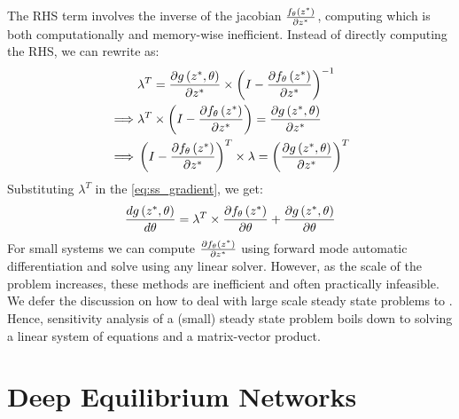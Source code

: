 %
The RHS term involves the inverse of the jacobian $\frac{f_\theta\left(z^*\right)}{\partial z^*}$, computing which is both computationally and memory-wise inefficient. Instead of directly computing the RHS, we can rewrite  as:
%
\begin{align}
           & \lambda^T = \frac{\partial g\left(z^*, \theta\right)}{\partial z^*} \times \left( I - \frac{\partial f_\theta\left(z^*\right)}{\partial z^*} \right)^{-1}                                       \\
  \implies & \lambda^T \times \left( I - \frac{\partial f_\theta\left(z^*\right)}{\partial z^*} \right) = \frac{\partial g\left(z^*, \theta\right)}{\partial z^*}                                            \\
  \implies & \left( I - \frac{\partial f_\theta\left(z^*\right)}{\partial z^*} \right)^T \times \lambda = \left(\frac{\partial g\left(z^*, \theta\right)}{\partial z^*}\right)^T \label{eq:ss_lambda_linear}
\end{align}
%
Substituting $\lambda^T$ in the \cref{eq:ss_gradient}, we get:
%
\begin{equation}
  \frac{d g\left(z^*, \theta\right)}{d \theta} = \lambda^T \times \frac{\partial f_\theta\left(z^*\right)}{\partial \theta} + \frac{\partial g\left(z^*, \theta\right)}{\partial \theta} \label{eq:ss_total_gradient}
\end{equation}
%
For small systems we can compute $\frac{\partial f_\theta\left(z^*\right)}{\partial z^*}$ using forward mode automatic differentiation and solve  using any linear solver. However, as the scale of the problem increases, these methods are inefficient and often practically infeasible. We defer the discussion on how to deal with large scale steady state problems to . Hence, sensitivity analysis of a (small) steady state problem boils down to solving a linear system of equations and a matrix-vector product.


\section{Deep Equilibrium Networks}
\label{sec:deep_equilibrium_networks}

